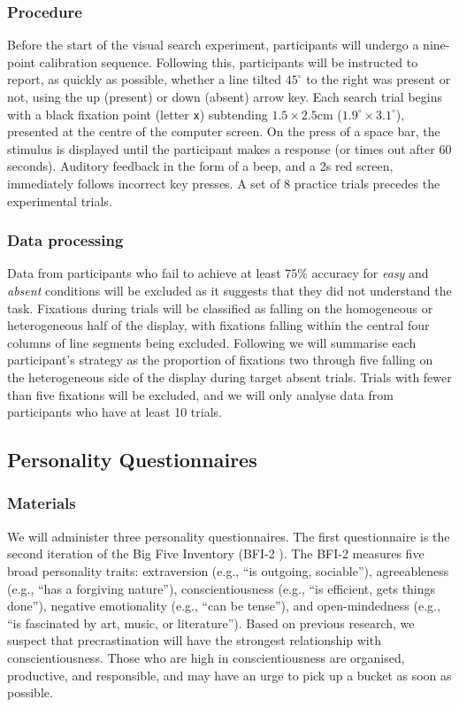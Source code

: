 \documentclass[]{rsos}
\begin{document}
\subsubsection{Procedure} Before the start of the visual search experiment, participants will undergo a nine-point calibration sequence. Following this, participants will be instructed to report, as quickly as possible, whether a line tilted $45^{\circ}$ to the right was present or not, using the up (present) or down (absent) arrow key. Each search trial begins with a black fixation point (letter \texttt{x}) subtending $1.5\times 2.5$cm ($1.9^{\circ}\times 3.1^{\circ}$), presented at the centre of the computer screen. On the press of a space bar, the stimulus is displayed until the participant makes a response (or times out after 60 seconds). Auditory feedback in the form of a beep, and a 2s red screen, immediately follows incorrect key presses. A set of 8 practice trials precedes the experimental trials.

\subsubsection{Data processing}

Data from participants who fail to achieve at least $75\%$ accuracy for \textit{easy} and \textit{absent} conditions will be excluded as it suggests that they did not understand the task. Fixations during trials will be classified as falling on the homogeneous or heterogeneous half of the display, with fixations falling within the central four columns of line segments being excluded. Following \cite{nowakowska2017} we will summarise each participant's strategy as the proportion of fixations two through five falling on the heterogeneous side of the display during target absent trials. Trials with fewer than five fixations will be excluded, and we will only analyse data from participants who have at least 10 trials. 

\subsection{Personality Questionnaires}

\subsubsection{Materials}

We will administer three personality questionnaires. The first questionnaire is the second iteration of the Big Five Inventory (BFI-2 \cite{soto2017}). The BFI-2 measures five broad personality traits: extraversion (e.g., ``is outgoing, sociable''), agreeableness (e.g., ``has a forgiving nature''), conscientiousness (e.g., ``is efficient, gets things done''), negative emotionality (e.g., ``can be tense''), and open-mindedness (e.g., ``is fascinated by art, music, or literature''). Based on previous research, we suspect that precrastination will have the strongest relationship with conscientiousness. Those who are high in conscientiousness are organised, productive, and responsible, and may have an urge to pick up a bucket as soon as possible.
\end{document}
